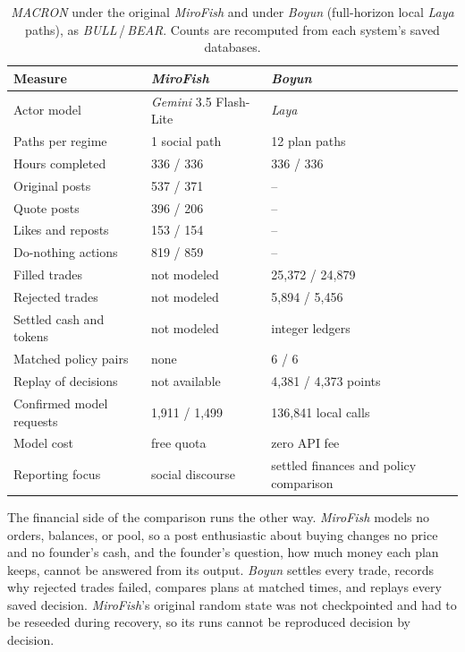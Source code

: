 \begin{table}[t]
\caption{\textit{MACRON} under the original \textit{MiroFish} and under
\textit{Boyun} (full-horizon local \textit{Laya} paths), as \textit{BULL}\,/\,\textit{BEAR}.
Counts are recomputed from each system's saved databases.}
\label{tab:mirofish}
\centering\footnotesize
\renewcommand{\arraystretch}{1.1}
\begin{tabularx}{\columnwidth}{@{}>{\raggedright\arraybackslash}p{}YY@{}}
\toprule
Measure & \textit{MiroFish} & \textit{Boyun} \\
\midrule
Actor model & \textit{Gemini} 3.5 Flash-Lite & \textit{Laya} \\
Paths per regime & 1 social path & 12 plan paths \\
Hours completed & 336 / 336 & 336 / 336 \\
Original posts & 537 / 371 & -- \\
Quote posts & 396 / 206 & -- \\
Likes and reposts & 153 / 154 & -- \\
Do-nothing actions & 819 / 859 & -- \\
Filled trades & not modeled & 25{,}372 / 24{,}879 \\
Rejected trades & not modeled & 5{,}894 / 5{,}456 \\
Settled cash and tokens & not modeled & integer ledgers \\
Matched policy pairs & none & 6 / 6 \\
Replay of decisions & not available & 4{,}381 / 4{,}373 points \\
Confirmed model requests & 1{,}911 / 1{,}499 & 136{,}841 local calls \\
Model cost & free quota & zero API fee \\
Reporting focus & social discourse & settled finances and policy comparison \\
\bottomrule
\end{tabularx}
\end{table}

The financial side of the comparison runs the other way. \textit{MiroFish}
models no orders, balances, or pool, so a post enthusiastic about buying
changes no price and no founder's cash, and the founder's question, how much
money each plan keeps, cannot be answered from its output. \textit{Boyun}
settles every trade, records why rejected trades failed, compares plans at
matched times, and replays every saved decision. \textit{MiroFish}'s original
random state was not checkpointed and had to be reseeded during recovery,
so its runs cannot be reproduced decision by decision.

